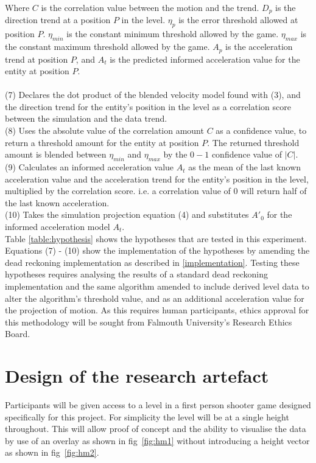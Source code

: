 \documentclass[journal]{IEEEtran}
\begin{document}
Where $C$ is the correlation value between the motion and the trend. $D_p$ is the direction trend at a position $P$ in the level. $\eta_p$ is the error threshold allowed at position $P$. $\eta_{min}$ is the constant minimum threshold allowed by the game. $\eta_{max}$ is the constant maximum threshold allowed by the game. $A_p$ is the acceleration trend at position $P$, and $A_t$ is the predicted informed acceleration value for the entity at position $P$. \\
\\
(7) Declares the dot product of the blended velocity model found with (3), and the direction trend for the entity's position in the level as a correlation score between the simulation and the data trend. \\
(8) Uses the absolute value of the correlation amount $C$ as a confidence value, to return a threshold amount for the entity at position $P$. The returned threshold amount is blended between $\eta_{min}$ and $\eta_{max}$ by the $0 - 1$ confidence value of $|C|$. \\
(9) Calculates an informed acceleration value $A_t$ as the mean of the last known acceleration value and the acceleration trend for the entity's position in the level, multiplied by the correlation score. i.e. a correlation value of $0$ will return half of the last known acceleration. \\
(10) Takes the simulation projection equation (4) and substitutes $A'_0$ for the informed acceleration model $A_t$. \\ 

Table \ref{table:hypothesis} shows the hypotheses that are tested in this experiment. Equations (7) - (10) show the implementation of the hypotheses by amending the dead reckoning implementation as described in \ref{implementation}. Testing these hypotheses requires analysing the results of a standard dead reckoning implementation and the same algorithm amended to include derived level data to alter the algorithm's threshold value, and as an additional acceleration value for the projection of motion. As this requires human participants, ethics approval for this methodology will be sought from Falmouth University’s Research Ethics Board.

\section{Design of the research artefact}

Participants will be given access to a level in a first person shooter game designed specifically for this project. For simplicity the level will be at a single height throughout. This will allow proof of concept and the ability to visualise the data by use of an overlay as shown in fig~\ref{fig:hm1} without introducing a height vector as shown in fig~\ref{fig:hm2}.
\end{document}

